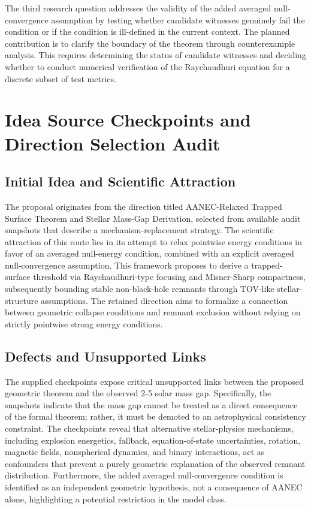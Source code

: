 \documentclass[conference]{IEEEtran}
\begin{document}
The third research question addresses the validity of the added averaged null-convergence assumption by testing whether candidate witnesses genuinely fail the condition or if the condition is ill-defined in the current context. The planned contribution is to clarify the boundary of the theorem through counterexample analysis. This requires determining the status of candidate witnesses and deciding whether to conduct numerical verification of the Raychaudhuri equation for a discrete subset of test metrics.

\section{Idea Source Checkpoints and Direction Selection Audit}
\subsection{Initial Idea and Scientific Attraction}
The proposal originates from the direction titled AANEC-Relaxed Trapped Surface Theorem and Stellar Mass-Gap Derivation, selected from available audit snapshots that describe a mechanism-replacement strategy. The scientific attraction of this route lies in its attempt to relax pointwise energy conditions in favor of an averaged null-energy condition, combined with an explicit averaged null-convergence assumption. This framework proposes to derive a trapped-surface threshold via Raychaudhuri-type focusing and Misner-Sharp compactness, subsequently bounding stable non-black-hole remnants through TOV-like stellar-structure assumptions. The retained direction aims to formalize a connection between geometric collapse conditions and remnant exclusion without relying on strictly pointwise strong energy conditions.

\subsection{Defects and Unsupported Links}
The supplied checkpoints expose critical unsupported links between the proposed geometric theorem and the observed 2-5 solar mass gap. Specifically, the snapshots indicate that the mass gap cannot be treated as a direct consequence of the formal theorem; rather, it must be demoted to an astrophysical consistency constraint. The checkpoints reveal that alternative stellar-physics mechanisms, including explosion energetics, fallback, equation-of-state uncertainties, rotation, magnetic fields, nonspherical dynamics, and binary interactions, act as confounders that prevent a purely geometric explanation of the observed remnant distribution. Furthermore, the added averaged null-convergence condition is identified as an independent geometric hypothesis, not a consequence of AANEC alone, highlighting a potential restriction in the model class.
\end{document}
